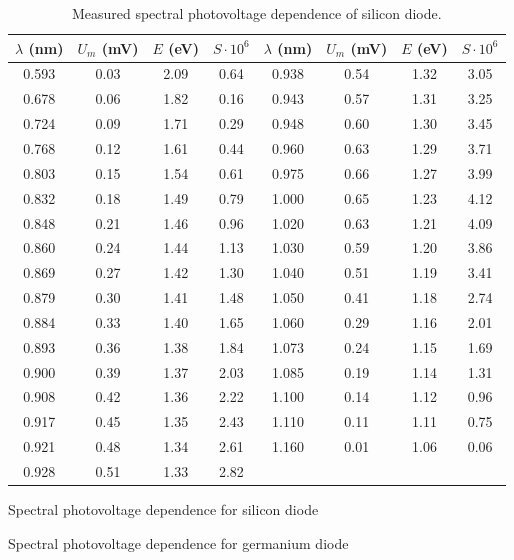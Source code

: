 \documentclass[a4paper,11pt]{article}
\begin{document}
\begin{table}[h]
    \scriptsize
    \centering
    \begin{tabular}{| c c c c | c c c c |}
        \hline
        $ \lambda $ (nm) & $ U_m $ (mV) & $ E $ (eV) & $ S \cdot 10^{6} $ & $ \lambda $ (nm) & $ U_m $ (mV) & $ E $ (eV) & $ S \cdot 10^{6} $ \\
        \hline
        0.593 & 0.03 & 2.09 & 0.64 & 0.938 & 0.54 & 1.32 & 3.05 \\
        0.678 & 0.06 & 1.82 & 0.16 & 0.943 & 0.57 & 1.31 & 3.25 \\
        0.724 & 0.09 & 1.71 & 0.29 & 0.948 & 0.60 & 1.30 & 3.45 \\
        0.768 & 0.12 & 1.61 & 0.44 & 0.960 & 0.63 & 1.29 & 3.71 \\
        0.803 & 0.15 & 1.54 & 0.61 & 0.975 & 0.66 & 1.27 & 3.99 \\
        0.832 & 0.18 & 1.49 & 0.79 & 1.000 & 0.65 & 1.23 & 4.12 \\
        0.848 & 0.21 & 1.46 & 0.96 & 1.020 & 0.63 & 1.21 & 4.09 \\
        0.860 & 0.24 & 1.44 & 1.13 & 1.030 & 0.59 & 1.20 & 3.86 \\
        0.869 & 0.27 & 1.42 & 1.30 & 1.040 & 0.51 & 1.19 & 3.41 \\
        0.879 & 0.30 & 1.41 & 1.48 & 1.050 & 0.41 & 1.18 & 2.74 \\
        0.884 & 0.33 & 1.40 & 1.65 & 1.060 & 0.29 & 1.16 & 2.01 \\
        0.893 & 0.36 & 1.38 & 1.84 & 1.073 & 0.24 & 1.15 & 1.69 \\
        0.900 & 0.39 & 1.37 & 2.03 & 1.085 & 0.19 & 1.14 & 1.31 \\
        0.908 & 0.42 & 1.36 & 2.22 & 1.100 & 0.14 & 1.12 & 0.96 \\
        0.917 & 0.45 & 1.35 & 2.43 & 1.110 & 0.11 & 1.11 & 0.75 \\
        0.921 & 0.48 & 1.34 & 2.61 & 1.160 & 0.01 & 1.06 & 0.06 \\
        0.928 & 0.51 & 1.33 & 2.82 &       &      &      &      \\
        \hline
    \end{tabular}
    \caption{Measured spectral photovoltage dependence of silicon diode.}
\end{table}


\begin{table}[htpb]
    \begin{minipage}[b]{.45\linewidth}
        \centering
        \resizebox{\textwidth}{!}{  }
        \captionsetup{type=graph}
        \caption{Spectral photovoltage dependence for silicon diode}
    \end{minipage} 
    \hfill
    \begin{minipage}[b]{.45\linewidth}
        \centering
        \resizebox{\textwidth}{!}{  }
        \captionsetup{type=graph}
        \caption{Spectral photovoltage dependence for germanium diode}
    \end{minipage} 
\end{table}
\end{document}
